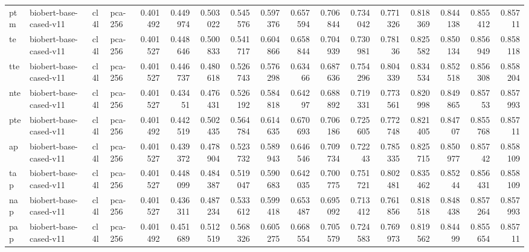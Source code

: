 \begin{tabular}{llllrrrrrrrrrrrrr}
 ptm         & biobert-base-cased-v11 & cl4l             & pca-256               &     0.401492 &     0.449974 &     0.503022 &     0.545576 &     0.597376 &     0.657594 &     0.706844 &     0.734042 &     0.771326 &     0.818369 &      0.844138 &      0.855412 &      0.85711  \\
 te          & biobert-base-cased-v11 & cl4l             & pca-256               &     0.401527 &     0.448646 &     0.500833 &     0.541717 &     0.604866 &     0.658844 &     0.704939 &     0.730981 &     0.78136  &     0.825582 &      0.850134 &      0.856949 &      0.858118 \\
 tte         & biobert-base-cased-v11 & cl4l             & pca-256               &     0.401527 &     0.446737 &     0.480618 &     0.526743 &     0.576298 &     0.63466  &     0.687636 &     0.754296 &     0.804339 &     0.834534 &      0.852518 &      0.856308 &      0.858204 \\
 nte         & biobert-base-cased-v11 & cl4l             & pca-256               &     0.401527 &     0.43451  &     0.476431 &     0.526192 &     0.584818 &     0.64297  &     0.688892 &     0.719331 &     0.773561 &     0.820998 &      0.849865 &      0.85753  &      0.857993 \\
 pte         & biobert-base-cased-v11 & cl4l             & pca-256               &     0.401492 &     0.442519 &     0.502435 &     0.564784 &     0.614635 &     0.670693 &     0.706186 &     0.725605 &     0.772748 &     0.821405 &      0.84707  &      0.855768 &      0.85711  \\
 ap          & biobert-base-cased-v11 & cl4l             & pca-256               &     0.401527 &     0.439372 &     0.478904 &     0.523732 &     0.589943 &     0.646546 &     0.709734 &     0.72243  &     0.785335 &     0.825715 &      0.850977 &      0.85742  &      0.858109 \\
 tap         & biobert-base-cased-v11 & cl4l             & pca-256               &     0.401527 &     0.448099 &     0.484387 &     0.519047 &     0.590683 &     0.642035 &     0.700775 &     0.751721 &     0.802481 &     0.835462 &      0.85244  &      0.856431 &      0.858109 \\
 nap         & biobert-base-cased-v11 & cl4l             & pca-256               &     0.401527 &     0.436311 &     0.487234 &     0.533612 &     0.599418 &     0.653487 &     0.695092 &     0.713412 &     0.761856 &     0.818518 &      0.848438 &      0.857264 &      0.857993 \\
 pap         & biobert-base-cased-v11 & cl4l             & pca-256               &     0.401492 &     0.451689 &     0.512519 &     0.568326 &     0.605275 &     0.668554 &     0.705579 &     0.724583 &     0.769973 &     0.819562 &      0.84499  &      0.855654 &      0.85711  \\

\end{tabular}
